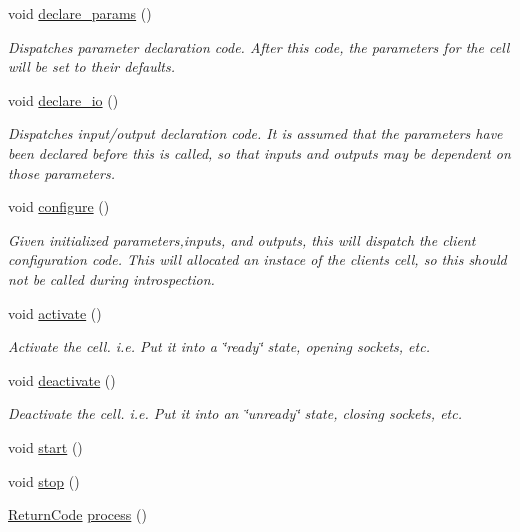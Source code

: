 \begin{DoxyCompactItemize}
\item 
void \hyperlink{structecto_1_1cell_a5c3c204f531de15920cb9d3db3ecfc4c}{declare\-\_\-params} ()
\begin{DoxyCompactList}\small\item\em Dispatches parameter declaration code. After this code, the parameters for the cell will be set to their defaults. \end{DoxyCompactList}\item 
void \hyperlink{structecto_1_1cell_af6c3782ed0d1c258bcf5050b4af272b4}{declare\-\_\-io} ()
\begin{DoxyCompactList}\small\item\em Dispatches input/output declaration code. It is assumed that the parameters have been declared before this is called, so that inputs and outputs may be dependent on those parameters. \end{DoxyCompactList}\item 
void \hyperlink{structecto_1_1cell_a30d48d21d6ffa86af4888f78e92241af}{configure} ()
\begin{DoxyCompactList}\small\item\em Given initialized parameters,inputs, and outputs, this will dispatch the client configuration code. This will allocated an instace of the clients cell, so this should not be called during introspection. \end{DoxyCompactList}\item 
void \hyperlink{structecto_1_1cell_a0416d7265db282a18202b58636be7165}{activate} ()
\begin{DoxyCompactList}\small\item\em Activate the cell. i.\-e. Put it into a \char`\"{}ready\char`\"{} state, opening sockets, etc. \end{DoxyCompactList}\item 
void \hyperlink{structecto_1_1cell_ab988f785fb943af3ff48c2d6f67a07aa}{deactivate} ()
\begin{DoxyCompactList}\small\item\em Deactivate the cell. i.\-e. Put it into an \char`\"{}unready\char`\"{} state, closing sockets, etc. \end{DoxyCompactList}\item 
void \hyperlink{structecto_1_1cell_a06abb010763ff7aeaaf2b28be4a6424a}{start} ()
\item 
void \hyperlink{structecto_1_1cell_abac52b774d350b02dc99a55c64b94bcd}{stop} ()
\item 
\hyperlink{namespaceecto_a93d82cd28db695d53963fb696582762c}{Return\-Code} \hyperlink{structecto_1_1cell_a6b810671ee21f5dddbc1206abfb999f3}{process} ()

\end{DoxyCompactItemize}
